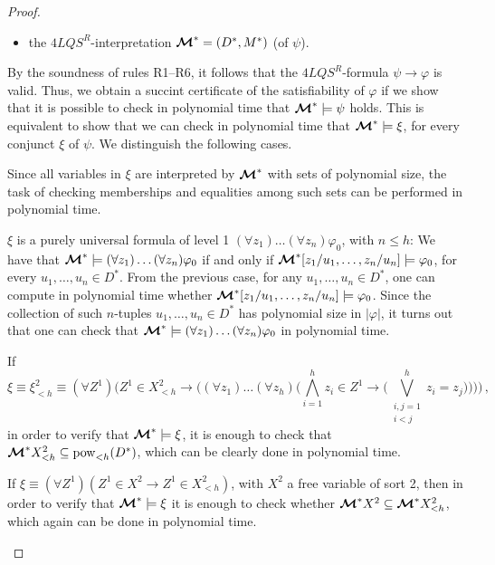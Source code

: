 \documentclass{fundam}
\newcommand{\model}{\ensuremath{\mbox{\boldmath $\mathcal{M}$}}\xspace}
\newcommand{\pow}{\mbox{\rm pow}}
\newcommand{\QLQSR}{\ensuremath{\mbox{$4\mathit{LQS}^{R}$}}\xspace}
\begin{document}
\begin{proof}
\begin{itemize}
    \item the $\QLQSR$-interpretation $\model^* = (D^*,M^*)$ (of
    $\psi$).
\end{itemize}
By the soundness of rules R1--R6, it follows that the $\QLQSR$-formula
$\psi \rightarrow \varphi$ is valid.  Thus, we obtain a succint
certificate of the satisfiability of $\varphi$ if we show that it is
possible to check in polynomial time that $\model^* \models \psi$
holds.  This is equivalent to show that we can check in polynomial
time that $\model^* \models \xi$, for every conjunct $\xi$ of $\psi$.
We distinguish the following cases.
\begin{description}
\item [$\xi$ is a quantifier-free atomic formula:] Since all variables
in $\xi$ are interpreted by $\model^*$ with sets of polynomial size,
the task of checking memberships and equalities among such sets can be
performed in polynomial time.

\begin{sloppypar}
\item [$\xi$ is a purely universal formula of level 1 $(\forall
z_1)\ldots(\forall z_n)\varphi_0$, with $n \leq h$:] We have that
$\model^* \models (\forall z_1)\ldots(\forall z_n)\varphi_0$ if and
only if $\model^*[z_1/u_1,\ldots,z_n/u_n] \models \varphi_0$, for
every $u_1,\ldots,u_n \in D^*$.  From the previous case, for any
$u_1,\ldots,u_n \in D^*$, one can compute in polynomial time whether
$\model^*[z_1/u_1,\ldots,z_n/u_n] \models \varphi_0$.  Since the
collection of such $n$-tuples $u_1,\ldots,u_n \in D^*$ has polynomial
size in $|\varphi|$, it turns out that one can check that $\model^*
\models (\forall z_1)\ldots(\forall z_n)\varphi_0$ in polynomial time.
\end{sloppypar}


\item [$\xi$ is a purely universal formula of level 2:]  If
\[
\xi \equiv \xi_{< h}^2 \equiv (\forall Z^1)\Big(Z^1 \in X_{< h}^2
\rightarrow \Big((\forall z_1)\ldots (\forall
      z_{h})\Big(\bigwedge_{i=1}^{h} z_i \in Z^1 \rightarrow
      \Big(\bigvee_{\substack{i,j=1\\  i<j}}^{h} z_i = z_j\Big)\Big)\Big)\Big) \, ,
\]
in order to verify that $\model^* \models \xi$, it is enough to check
that $\model^* X_{< h}^2 \subseteq \pow_{< h}(D^*)$, which can be
clearly done in polynomial time.

If $\xi \equiv (\forall Z^1)(Z^1 \in X^2 \rightarrow
Z^1 \in X_{< h}^2)$, with $X^2$ a free variable of sort 2, then in
order to verify that $\model^* \models \xi$ it is enough to check
whether $\model^* X^2 \subseteq \model^* X_{< h}^2$, which again can
be done in polynomial time.


\end{description}
\end{proof}
\end{document}
